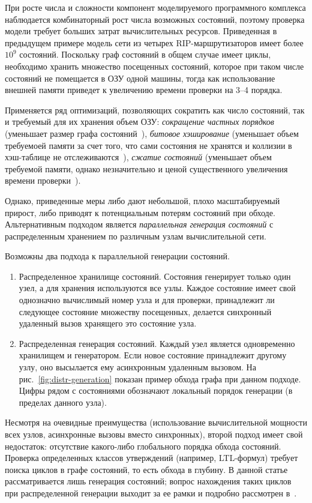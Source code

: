 \documentclass[12pt,a4paper,fleqn]{article}
\begin{document}
При росте числа и сложности компонент моделируемого программного комплекса наблюдается комбинаторный рост числа
возможных состояний, поэтому проверка модели требует больших затрат вычислительных ресурсов. Приведенная в предыдущем
примере модель сети из четырех RIP-маршрутизаторов имеет более $10^9$ состояний. Поскольку граф состояний в общем случае
имеет циклы, необходимо хранить множество посещенных состояний, которое при таком числе состояний не помещается в ОЗУ
одной машины, тогда как использование внешней памяти приведет к увеличению времени проверки на 3--4 порядка.

Применяется ряд оптимизаций, позволяющих сократить как число состояний, так и требуемый для их хранения объем ОЗУ:
\emph{сокращение частных порядков} (уменьшает размер графа состояний~\cite{POD}), \emph{битовое хэширование} (уменьшает
объем требуемоей памяти за счет того, что сами состояния не хранятся и коллизии в хэш-таблице не
отслеживаются~\cite{BitHash1, Wolper}), \emph{сжатие состояний} (уменьшает объем требуемой памяти, однако незначительно
и ценой существенного увеличения времени проверки~\cite{StateCompr}).

Однако, приведенные меры либо дают небольшой, плохо масштабируемый прирост, либо приводят к потенциальным потерям
состояний при обходе. Альтернативным подходом является \emph{параллельная генерация состояний} с распределенным
хранением по различным узлам вычислительной сети.

Возможны два подхода к параллельной генерации состояний.

\begin{enumerate}
\item Распределенное хранилище состояний. Состояния генерирует только один узел, а для хранения используются все
  узлы. Каждое состояние имеет свой однозначно вычислимый номер узла и для проверки, принадлежит ли следующее состояние
  множеству посещенных, делается синхронный удаленный вызов хранящего это состояние узла.

\item Распределенная генерация состояний. Каждый узел является одновременно хранилищем и генератором. Если новое
  состояние принадлежит другому узлу, оно высылается ему асинхронным удаленным вызовом. На
  рис.~\ref{fig:distr-generation} показан пример обхода графа при данном подходе. Цифры рядом с состояниями обозначают
  локальный порядок генерации (в пределах данного узла).
\end{enumerate}

Несмотря на очевидные преимущества (использование вычислительной мощности всех узлов, асинхронные вызовы вместо
синхронных), второй подход имеет свой недостаток: отсутствие какого-либо глобального порядка обхода состояний. Проверка
определенных классов утверждений (например, LTL-формул) требует поиска циклов в графе состояний, то есть обхода в
глубину. В данной статье рассматривается лишь генерация состояний; вопрос нахождения таких циклов при распределенной
генерации выходит за ее рамки и подробно рассмотрен в~\cite{DLTL1,DLTL2}.
\end{document}

